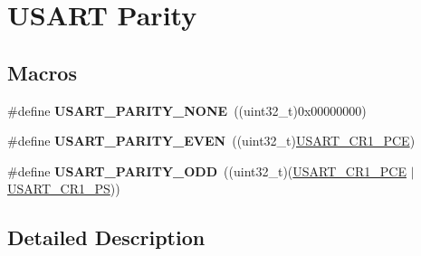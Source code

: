 \hypertarget{group___u_s_a_r_t___parity}{}\section{U\+S\+A\+RT Parity}
\label{group___u_s_a_r_t___parity}
\subsection*{Macros}
\begin{DoxyCompactItemize}
\item 
\#define {\bfseries U\+S\+A\+R\+T\+\_\+\+P\+A\+R\+I\+T\+Y\+\_\+\+N\+O\+NE}~((uint32\+\_\+t)0x00000000)\hypertarget{group___u_s_a_r_t___parity_ga85bfcbeb5ba1c34bbcda3f3e3b994846}{}\label{group___u_s_a_r_t___parity_ga85bfcbeb5ba1c34bbcda3f3e3b994846}

\item 
\#define {\bfseries U\+S\+A\+R\+T\+\_\+\+P\+A\+R\+I\+T\+Y\+\_\+\+E\+V\+EN}~((uint32\+\_\+t)\hyperlink{group___peripheral___registers___bits___definition_ga60f8fcf084f9a8514efafb617c70b074}{U\+S\+A\+R\+T\+\_\+\+C\+R1\+\_\+\+P\+CE})\hypertarget{group___u_s_a_r_t___parity_gae7630824c78a39366b7e5b4c55996200}{}\label{group___u_s_a_r_t___parity_gae7630824c78a39366b7e5b4c55996200}

\item 
\#define {\bfseries U\+S\+A\+R\+T\+\_\+\+P\+A\+R\+I\+T\+Y\+\_\+\+O\+DD}~((uint32\+\_\+t)(\hyperlink{group___peripheral___registers___bits___definition_ga60f8fcf084f9a8514efafb617c70b074}{U\+S\+A\+R\+T\+\_\+\+C\+R1\+\_\+\+P\+CE} $\vert$ \hyperlink{group___peripheral___registers___bits___definition_ga2e159d36ab2c93a2c1942df60e9eebbe}{U\+S\+A\+R\+T\+\_\+\+C\+R1\+\_\+\+PS}))\hypertarget{group___u_s_a_r_t___parity_ga184f3e22cb30ea94b797b02e94e774a1}{}\label{group___u_s_a_r_t___parity_ga184f3e22cb30ea94b797b02e94e774a1}

\end{DoxyCompactItemize}


\subsection{Detailed Description}
